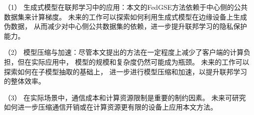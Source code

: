 （1）
生成式模型在联邦学习中的应用：本文的FedGSE方法依赖于中心侧的公共数据集来计算梯度。
未来的工作可以探索如何利用生成式模型在边缘设备上生成伪数据，
从而减少对中心侧公共数据集的依赖，进一步提升联邦学习的隐私保护能力。

（2）
模型压缩与加速：尽管本文提出的方法在一定程度上减少了客户端的计算负担，但在实际应用中，
模型的规模和复杂度仍然可能成为瓶颈。
未来的工作可以探索如何在子模型抽取的基础上，
进一步进行模型压缩和加速，以提升联邦学习的整体效率。

（3）
在实际场景中，通信成本和计算资源限制是重要的制约因素。
未来可研究如何进一步压缩通信开销或在计算资源更有限的设备上应用本文方法。